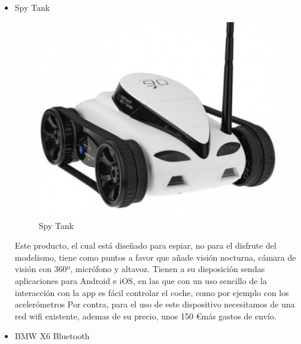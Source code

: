 \documentclass{pclass}
\begin{document}
\clearpage
\begin{itemize}
    \item Spy Tank


\begin{figure}[H]
  \centering
    \includegraphics[width=1.1\textwidth]{img/producto1}
  \caption{Spy Tank}
  \label{fig:SpyTank}
\end{figure}



Este producto, el cual está diseñado para espiar, no para el disfrute del modelismo, tiene como puntos a favor que añade visión nocturna, cámara de visión con 360º, micrófono y altavoz. Tienen a su disposición sendas aplicaciones para Android e iOS, en las que con un uso sencillo de la interacción con la app es fácil controlar el coche, como por ejemplo con los acelerómetros Por contra, para el uso de este dispositivo necesitamos de una red wifi existente, ademas de su precio, unos 150 \euro más gastos de envío.


	\clearpage
    \item BMW X6 Bluetooth
\end{itemize}
\end{document}
